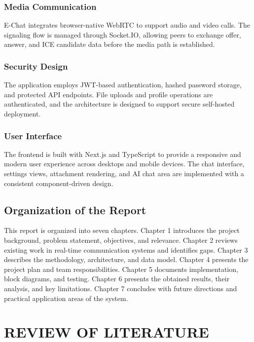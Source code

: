 \documentclass[12pt,a4paper,oneside]{report}
\begin{document}
\subsection{Media Communication}
\label{subsec:media-communication}
E-Chat integrates browser-native WebRTC to support audio and video calls. The
signaling flow is managed through Socket.IO, allowing peers to exchange offer,
answer, and ICE candidate data before the media path is established.

\subsection{Security Design}
\label{subsec:security-design}
The application employs JWT-based authentication, hashed password storage, and
protected API endpoints. File uploads and profile operations are authenticated,
and the architecture is designed to support secure self-hosted deployment.

\subsection{User Interface}
\label{subsec:user-interface}
The frontend is built with Next.js and TypeScript to provide a responsive and
modern user experience across desktops and mobile devices. The chat interface,
settings views, attachment rendering, and AI chat area are implemented with a
consistent component-driven design.

\section{Organization of the Report}
\label{sec:organization-report}
This report is organized into seven chapters. Chapter 1 introduces the project
background, problem statement, objectives, and relevance. Chapter 2 reviews
existing work in real-time communication systems and identifies gaps. Chapter 3
describes the methodology, architecture, and data model. Chapter 4 presents the
project plan and team responsibilities. Chapter 5 documents implementation,
block diagrams, and testing. Chapter 6 presents the obtained results, their
analysis, and key limitations. Chapter 7 concludes with future directions and
practical application areas of the system.

\cleardoublepage

\chapter{REVIEW OF LITERATURE}
\label{chap:literature}
\thispagestyle{plain}
\end{document}
